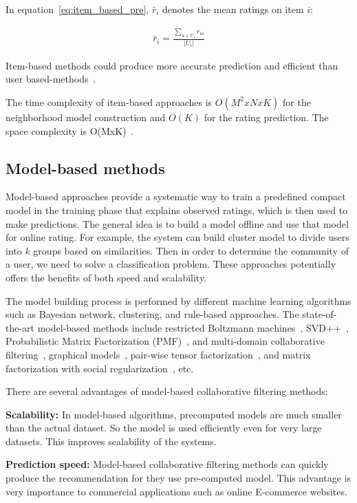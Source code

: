 \documentclass[oneside,13pt]{extreport}
\begin{document}
In equation~\ref{eq:item_based_pre}, $\bar r_i$ denotes the mean ratings on item $i$:

\begin{eqnarray}
\label{eq:mean_rating_item}
\bar r_i = \frac{{\sum\nolimits_{u \in {U_i}} {{r_{ui}}} }}{{\left| {{U_i}} \right|}}
\end{eqnarray}

Item-based methods could produce more accurate prediction and efficient than user based-methods~\cite{Sarwar01}.

The time complexity of item-based approaches is $O(M^2xNxK)$ for the neighborhood model construction and $O(K)$ for the rating prediction. The  space complexity is O(MxK)~\cite{Chevalier}.
\subsection{Model-based methods}
Model-based approaches provide a systematic way to train a predefined compact model in the training phase that explains observed ratings, which is then used to make predictions. The general idea is to build a model offline and use that model for online rating. For example, the system can build cluster model to divide users into $k$ groups based on similarities. Then in order to determine the community of a user, we need to solve a classification problem. These approaches potentially offers the benefits of both speed and scalability.

The model building process is performed by different machine learning algorithms such as Bayesian network, clustering, and rule-based approaches. The state-of-the-art model-based methods include restricted
Boltzmann machines~\cite{Salakhutdinov07}, SVD++~\cite{KorenMatrix}, Probabilistic Matrix Factorization (PMF)~\cite{SalakhutdinovMF07}, and multi-domain collaborative filtering~\cite{Zhang10}, graphical models~\cite{Jin03}, pair-wise tensor factorization~\cite{Rendle10}, and matrix factorization with social regularization~\cite{Ma11}, etc.

There are several advantages of model-based collaborative filtering methods:
\begin{description}
    \item{\textbf{Scalability:}} In model-based algorithms, precomputed models are much smaller than the actual dataset. So the model is used efficiently even for very large datasets. This improves scalability of the systems. 
    \item{\textbf{Prediction speed:}} Model-based collaborative filtering methods can quickly produce the recommendation for they use pre-computed model. This advantage is very importance to commercial applications such as online E-commerce websites.
\end{description}
\end{document}
